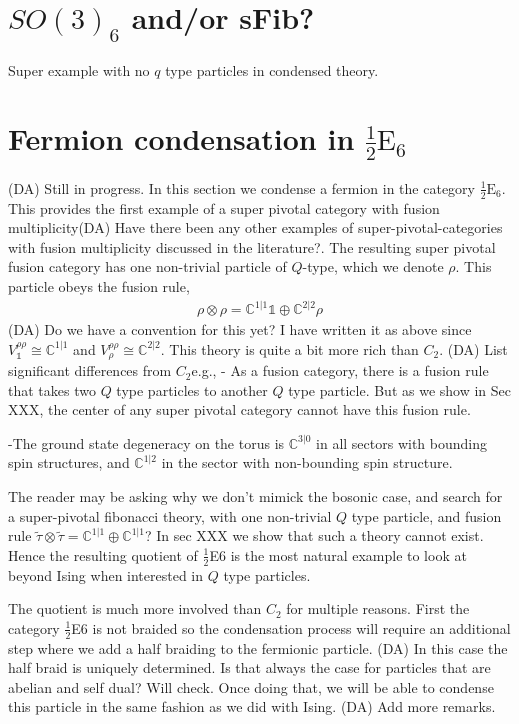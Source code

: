 \documentclass[12pt,a4paper]{article}
\newcommand{\tp}{\otimes}
\newcommand{\dave}[1]{{\color{ao(english)}\footnotesize{(DA) #1}}}
\newcommand{\halfesix}{\frac{1}{2}\text{E}_6}
\begin{document}
\section{$SO(3)_6$ and/or sFib?}
Super example with no $q$ type particles in condensed theory.


\section{Fermion condensation in $\halfesix$} \label{e6}
\dave{Still in progress.}
In this section we condense a fermion in the category $\halfesix$.
This provides the first example of a super pivotal category with fusion multiplicity\dave{Have there been any other examples of super-pivotal-categories with fusion multiplicity discussed in the literature?}.
The resulting super pivotal fusion category has one non-trivial particle of $Q$-type, which we denote $\rho$.
This particle obeys the fusion rule,
\begin{align}
\rho \tp \rho = \mathbb{C}^{1|1} \mathds{1} \oplus \mathbb{C}^{2|2} \rho
\end{align}
\dave{Do we have a convention for this yet? I have written it as above since $V^{\rho \rho}_\mathds{1}  \cong  \mathbb{C}^{1|1}$ and $ V^{\rho \rho}_\rho \cong \mathbb{C}^{2|2}$.}
This theory is quite a bit more rich than $C_2$. 
\dave{List significant differences from $C_2$}e.g.,
- As a fusion category, there is a fusion rule that takes two $Q$ type particles to another $Q$ type particle. 
But as we show in Sec XXX, the center of any super pivotal category cannot have this fusion rule.

-The ground state degeneracy on the torus is $\mathbb{C}^{3|0}$ in all sectors with bounding spin structures, and $\mathbb{C}^{1|2}$ in the sector with non-bounding spin structure.

The reader may be asking why we don't mimick the bosonic case, and search for a super-pivotal fibonacci theory, with one non-trivial $Q$ type particle, and fusion rule $\tilde{\tau} \tp \tilde{\tau} = \mathbb{C}^{1|1} \oplus \mathbb{C}^{1|1}$?
In sec XXX we show that such a theory cannot exist.
Hence the resulting quotient of $\frac{1}{2}$E6 is the most natural example to look at beyond Ising when interested in $Q$ type particles. 

The quotient is much more involved than $C_2$ for multiple reasons. 
First the category $\frac{1}{2}$E6 is not braided so the condensation process will require an additional step where we add a half braiding to the fermionic particle.
\dave{In this case the half braid is uniquely determined. Is that always the case for particles that are abelian and self dual? Will check.}
Once doing that, we will be able to condense this particle in the same fashion as we did with Ising.
\dave{Add more remarks.}
\end{document}
